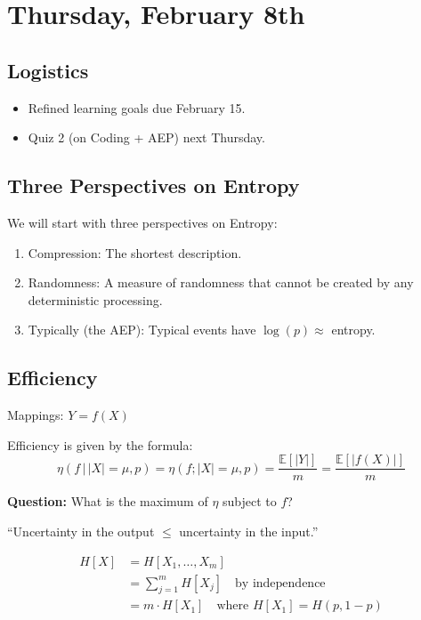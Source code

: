 \section{Thursday, February 8th}
\subsection{Logistics}

\begin{itemize}
    \item Refined learning goals due February 15.
    \item Quiz 2 (on Coding + AEP) next Thursday.
\end{itemize}

\subsection{Three Perspectives on Entropy}

We will start with three perspectives on Entropy:

\begin{enumerate}
    \item Compression: The shortest description.
    \item Randomness: A measure of randomness that cannot be created by any deterministic processing.
    \item Typically (the AEP): Typical events have \( \log(p) \approx \) entropy.
\end{enumerate}

\subsection{Efficiency}

Mappings: \( Y = f(X) \)

Efficiency is given by the formula:
\begin{equation*}
    \eta(f \,|\, |X| = \mu, p) = \eta(f; |X| = \mu, p) = \frac{\mathbb{E}[|Y|]}{m} = \frac{\mathbb{E}[|f(X)|]}{m}
\end{equation*}

\textbf{Question:} What is the maximum of \( \eta \) subject to \( f \)?

``Uncertainty in the output \( \leq \) uncertainty in the input.''

\begin{align*}
    H[X] &= H[X_1, \ldots, X_m] \\
         &= \sum_{j=1}^m H[X_j] \quad \text{by independence} \\
         &= m \cdot H[X_1] \quad \text{where } H[X_1] = H(p,1-p)
\end{align*}

